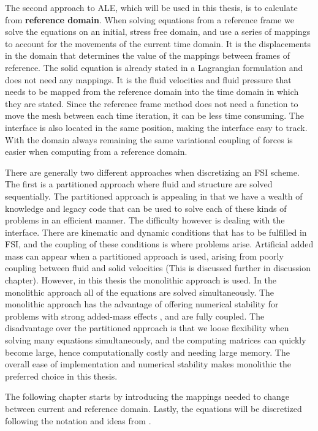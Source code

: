 The second approach to ALE, which will be used in this thesis, is to calculate from \textbf{reference domain}.
When solving equations from a reference frame we solve the equations on an initial, stress free domain, and use a series of mappings to account for the movements of the current time domain. It is the displacements in the domain that determines the value of the mappings between frames of reference. The solid equation is already stated in a Lagrangian formulation and does not need any mappings. It is the fluid velocities and fluid pressure that needs to be mapped from the reference domain into the time domain in which they are stated.
Since the reference frame method does not need a function to move the mesh between each time iteration, it can be less time consuming. The interface is also located in the same position, making the interface easy to track. With the domain always remaining the same variational coupling of forces is easier when computing from a reference domain.\newline

There are generally two different approaches when discretizing an FSI scheme. The first is a partitioned approach where fluid and structure are solved sequentially. The partitioned approach is appealing in that we have a wealth of knowledge and legacy code that can be used to solve each of these kinds of problems in an efficient manner. The difficulty however is dealing with the interface. There are kinematic and dynamic conditions that has to be fulfilled in FSI, and the coupling of these conditions is where problems arise. Artificial added mass can appear when a partitioned approach is used, arising from poorly coupling between fluid and solid velocities (This is discussed further in discussion chapter). However, in this thesis the monolithic approach is used. In the monolithic approach all of the equations are solved simultaneously. The monolithic approach has the advantage of offering numerical stability for problems with strong added-mass effects \cite{Liu2014}, and are fully coupled. The disadvantage over the partitioned approach is that we loose flexibility when solving many equations simultaneously, and the computing matrices can quickly become large, hence computationally costly and needing large memory. The overall ease of implementation and numerical stability makes monolithic the preferred choice in this thesis. \newline

The following chapter starts by introducing the mappings needed to change between current and reference domain. Lastly, the equations will be discretized following the notation and ideas from \cite{Richter2010}.

